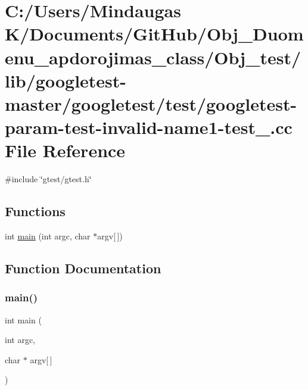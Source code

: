 \hypertarget{_obj__test_2lib_2googletest-master_2googletest_2test_2googletest-param-test-invalid-name1-test___8cc}{}\section{C\+:/\+Users/\+Mindaugas K/\+Documents/\+Git\+Hub/\+Obj\+\_\+\+Duomenu\+\_\+apdorojimas\+\_\+class/\+Obj\+\_\+test/lib/googletest-\/master/googletest/test/googletest-\/param-\/test-\/invalid-\/name1-\/test\+\_\+.cc File Reference}
\label{_obj__test_2lib_2googletest-master_2googletest_2test_2googletest-param-test-invalid-name1-test___8cc}
{\ttfamily \#include \char`\"{}gtest/gtest.\+h\char`\"{}}\newline
\subsection*{Functions}
\begin{DoxyCompactItemize}
\item 
int \mbox{\hyperlink{_obj__test_2lib_2googletest-master_2googletest_2test_2googletest-param-test-invalid-name1-test___8cc_a0ddf1224851353fc92bfbff6f499fa97}{main}} (int argc, char $\ast$argv\mbox{[}$\,$\mbox{]})
\end{DoxyCompactItemize}


\subsection{Function Documentation}
\mbox{\label{_obj__test_2lib_2googletest-master_2googletest_2test_2googletest-param-test-invalid-name1-test___8cc_a0ddf1224851353fc92bfbff6f499fa97}} 
\subsubsection{\texorpdfstring{main()}{main()}}
{\footnotesize\ttfamily int main (\begin{DoxyParamCaption}\item[{int}]{argc,  }\item[{char $\ast$}]{argv\mbox{[}$\,$\mbox{]} }\end{DoxyParamCaption})}

